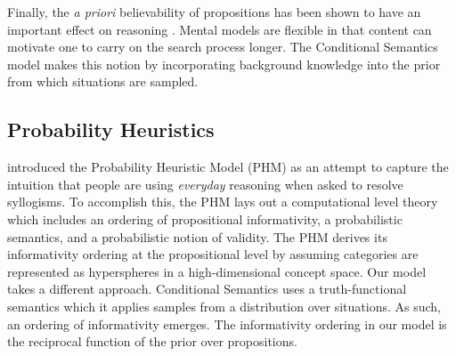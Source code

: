 \documentclass[10pt,letterpaper]{article}
\begin{document}
Finally, the \emph{a priori} believability of propositions has been shown to have an important effect on reasoning \cite{Oakhill1989}. Mental models are flexible in that content can motivate one to carry on the search process longer. The Conditional Semantics model makes this notion by incorporating background knowledge into the prior from which situations are sampled. 


%

\subsection{Probability Heuristics}

\cite{Chater1999} introduced the Probability Heuristic Model (PHM) as an attempt to capture the intuition that people are using \emph{everyday} reasoning when asked to resolve syllogisms. To accomplish this, the PHM lays out a computational level theory which includes an ordering of propositional informativity, a probabilistic semantics, and a probabilistic notion of validity. The PHM derives its informativity ordering at the propositional level by assuming categories are represented as hyperspheres in a high-dimensional concept space. Our model takes a different approach. Conditional Semantics uses a truth-functional semantics which it applies samples from a distribution over situations. As such, an ordering of informativity emerges. The informativity ordering in our model is the reciprocal function of the prior over propositions. 
\end{document}
